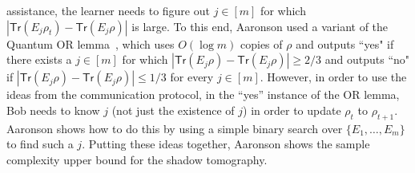 \documentclass[11pt]{article}
\newcommand{\Tr}{\textsf{Tr}}
\begin{document}
assistance, the learner needs to figure out $j\in [m]$ for which $|\Tr(E_j\rho_t)-\Tr(E_j\rho)|$ is
large. To this end, Aaronson  used a variant of the Quantum
OR lemma~\cite{DBLP:conf/soda/HarrowLM17}, which uses $O(\log m)$ copies of $\rho$ and outputs ``yes" if there exists a $j\in [m]$ for which $|\Tr(E_j \rho) - \Tr(E_j\rho)| \geq 2/3$ and outputs
``no" if $|\Tr(E_j \rho) - \Tr(E_j\rho)| \leq 1/3$ for every $j\in [m]$. However, in order to use the ideas from the communication protocol,  in the “yes” instance of the OR lemma, Bob needs to know $j$ (not just the existence of $j$) in order to update $\rho_t$ to $\rho_{t+1}$. Aaronson shows how to do this by using a simple binary search over $\{E_1,\ldots, E_m\}$ to find such a $j$. Putting these ideas together, Aaronson shows the sample complexity upper bound for the shadow tomography.
\end{document}
